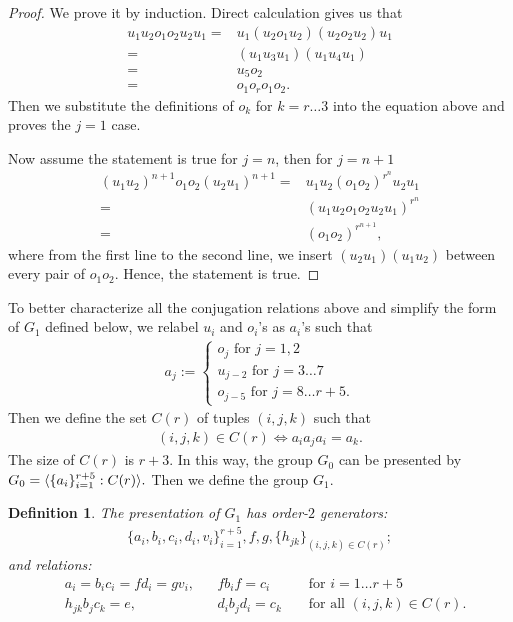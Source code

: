 \documentclass[11pt,letterpaper]{article}
\DeclarePairedDelimiter{\ip}{\langle}{\rangle}
\newcommand{\1}{\mathbb{1}}
\newtheorem{definition}[theorem]{Definition}
\theoremstyle{definition}
\begin{document}
\begin{proof}
	We prove it by induction.
	Direct calculation gives us that
	\begin{align*} 
		u_1u_2 o_1o_2 u_2u_1 = &u_1 (u_2 o_1u_2) (u_2o_2 u_2) u_1 \\
	=& (u_1 u_3 u_1) (u_1 u_4 u_1)\\
	=& u_5 o_2\\
	=& o_1o_ro_1 o_2.
	\end{align*}
	Then we substitute the definitions of $o_k$ for $k = r \dots 3$ into the equation above and
	proves the $j=1$ case.
	
	Now assume the statement is true for $j = n$, then for $j = n+1$
	\begin{align*}
		(u_1u_2)^{n+1} o_1o_2 (u_2u_1)^{n+1} =& u_1u_2 (o_1o_2)^{r^n} u_2u_1 \\ 
		 =& (u_1u_2 o_1o_2 u_2u_1)^{r^n} \\
		 =& (o_1o_2)^{r^{n+1}},
	\end{align*}
	where from the first line to the second line, we insert $(u_2u_1)(u_1u_2)$ between every pair of $o_1o_2$.
	Hence, the statement is true.
\end{proof}
To better characterize all the conjugation relations above and simplify the form of $G_1$ defined below, 
we relabel $u_i$ and $o_i$'s
as $a_i$'s such that
\begin{align}
	a_j := 
	\begin{cases}
	 o_j \text{ for } j = 1,2 \\
	 u_{j-2} \text{ for } j = 3\dots 7 \\
	o_{j- 5} \text{ for } j = 8 \dots r+5.
	\end{cases}
\end{align}
Then we define the set $C(r)$ of tuples $(i,j,k)$ such that
\begin{align*}
	(i,j,k) \in C(r) \iff a_ia_ja_i = a_k.
\end{align*}
The size of $C(r)$ is $r+3$. 
In this way, the group $G_0$ can be presented by
$
G_0  = \ip{ \{a_i\}_{i=1}^{r+5} : C(r) }.
$
Then we define the group $G_1$.
\begin{definition}
The presentation of $G_1$ has order-$2$ generators:
\begin{align*}
	\{a_i, b_i, c_i, d_i, v_i\}_{i=1}^{r+5}, f, g, \{h_{jk}\}_{(i,j,k) \in C(r)};
\end{align*}
and relations:
\begin{align*}
	&a_i = b_ic_i = fd_i = gv_i,&& fb_if =c_i &&\text{ for } i= 1 \dots r+5 \\
	&h_{jk}b_j c_k = e,&& d_ib_jd_i = c_k &&\text{ for all } (i,j,k) \in C(r).
\end{align*}
\end{definition}
\end{document}
